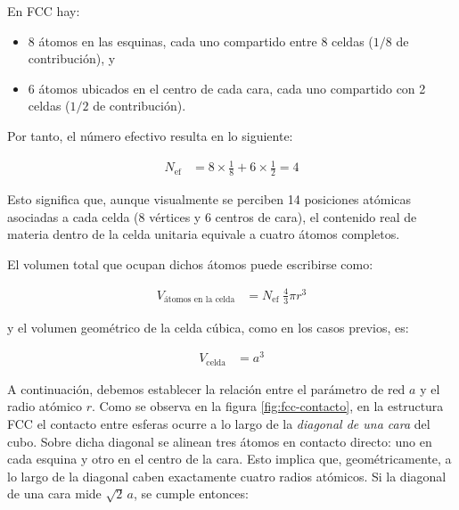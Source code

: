 \documentclass{article}
\begin{document}
En FCC hay:

\begin{itemize}
\item[$\bullet$] 8 átomos en las esquinas, cada uno compartido entre 8 celdas (\(1/8\) de contribución), y  
\item[$\bullet$] 6 átomos ubicados en el centro de cada cara, cada uno compartido con 2 celdas (\(1/2\) de contribución).  
\end{itemize}

Por tanto, el número efectivo resulta en lo siguiente:

\begin{equation}
\begin{split}
N_{\text{ef}} &= 8\times\frac{1}{8} + 6\times\frac{1}{2} = 4
\end{split} \label{eq:nef-fcc}
\end{equation}

Esto significa que, aunque visualmente se perciben 14 posiciones atómicas asociadas a cada celda (8 vértices y 6 centros de cara), el contenido real de materia dentro de la celda unitaria equivale a cuatro átomos completos.

El volumen total que ocupan dichos átomos puede escribirse como:

\begin{equation}
\begin{split}
V_{\text{átomos en la celda}} &= N_{\text{ef}}\;\frac{4}{3}\pi r^{3}
\end{split} \label{eq:vol-atomos-fcc}
\end{equation}

y el volumen geométrico de la celda cúbica, como en los casos previos, es:

\begin{equation}
\begin{split}
V_{\text{celda}} &= a^{3}
\end{split} \label{eq:vol-celda-fcc}
\end{equation}

A continuación, debemos establecer la relación entre el parámetro de red \(a\) y el radio atómico \(r\).  
Como se observa en la figura \ref{fig:fcc-contacto}, en la estructura FCC el contacto entre esferas ocurre a lo largo de la \textit{diagonal de una cara} del cubo.  
Sobre dicha diagonal se alinean tres átomos en contacto directo: uno en cada esquina y otro en el centro de la cara.  
Esto implica que, geométricamente, a lo largo de la diagonal caben exactamente cuatro radios atómicos.  
Si la diagonal de una cara mide \(\sqrt{2}\,a\), se cumple entonces:
\end{document}
